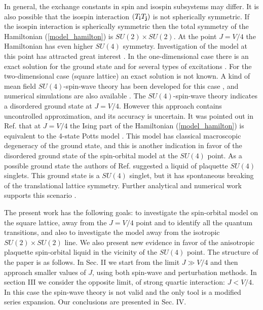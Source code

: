 In general, the exchange constants in spin and isospin subsystems may differ.
It is also possible that the isospin interaction 
$( T_{\bf i} T_{\bf j} )$ is not spherically symmetric.
If the isospin interaction is spherically symmetric then the total
symmetry of the Hamiltonian (\ref{model_hamilton}) is
$SU(2)\times SU(2)$. At the point $J=V/4$ the Hamiltonian
has even higher $SU(4)$ symmetry. Investigation of the model
at this point has attracted great interest
\cite{firstSU4,su4swave2,exact1d,azaria}. 
In the one-dimensional case there is an exact solution for the ground state
and for several types of excitations \cite{exact1d,firstexact1d}.
For the two-dimensional case (square lattice) an exact solution is not known. 
A kind of mean field $SU(4)$-spin-wave theory has been 
developed for this case \cite{su4swave2,su4swave}, and numerical simulations 
are also available \cite{su4calc,su4calc2}.
The $SU(4)$-spin-wave theory indicates a disordered ground state at $J=V/4.$
However this approach contains uncontrolled approximation, and its
accuracy is uncertain.
It was pointed out in Ref. \cite{su4swave2}  that at $J=V/4$ the
Ising part of the Hamiltonian (\ref{model_hamilton}) is
equivalent to the 4-state Potts model \cite{potts}.
This model has  classical macroscopic degeneracy of the ground state,
and this is another indication in favor of the disordered ground state of
the spin-orbital model at the $SU(4)$ point.
As a possible ground  state the authors of Ref. \cite{su4swave2}
suggested a liquid of plaquette $SU(4)$ singlets.
This ground state is a $SU(4)$ singlet, but it has spontaneous
breaking of the translational lattice symmetry. Further analytical and 
numerical work supports this scenario \cite{su4swave,su4calc,su4calc2}.

The present work has the following goals: to investigate the spin-orbital
model on the square lattice, away from the $J=V/4$ point and to identify all the
quantum transitions, and also to investigate the model away from the
isotropic $SU(2)\times SU(2)$ line. We also present new evidence
in favor of the anisotropic plaquette spin-orbital liquid in the vicinity
of the $SU(4)$ point.
The structure of the paper is as follows. In Sec. II we 
start from the limit $J \gg V/4$ and then approach smaller values
of $J$, using both spin-wave and perturbation methods. 
In section III we consider the opposite limit, of
strong quartic interaction: $J < V/4$. In this case the spin-wave 
theory is not valid and the only tool is a modified series expansion.
Our conclusions are presented in Sec. IV.

